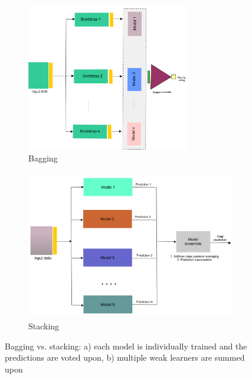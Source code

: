 \begin{figure}[htp!]
	\centering
	\begin{subfigure}{.48\linewidth}
		\centering
		\includegraphics[width=\linewidth,height=65mm]{images/bagging.png}
		\caption{Bagging}
        \label{fig:bagging}
	\end{subfigure}
	\hspace{2mm}
	\begin{subfigure}{0.48\linewidth}
		\centering
		\includegraphics[width=\linewidth,height=65mm]{images/stacking.png}
		\caption{Stacking}
        \label{fig:stacking}
	\end{subfigure}
	\caption[Bagging vs. stacking]{Bagging vs. stacking: a) each model is individually trained and the predictions are voted upon, b) multiple weak learners are summed upon} 
	\label{fig:bagging_and_stacking}
	\vspace{-2mm}
\end{figure}

